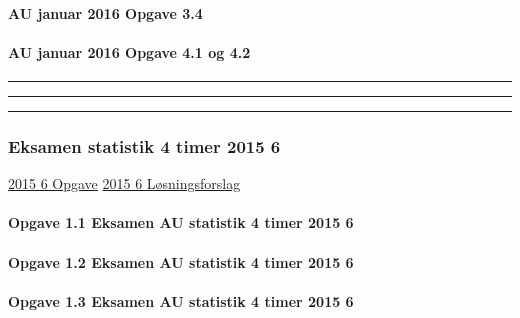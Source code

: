 \documentclass[]{book}
\let\oldparagraph\paragraph
\renewcommand{\paragraph}[1]{\oldparagraph{#1}\mbox{}}
\begin{document}
\hypertarget{au-januar-2016-opgave-3.4}{%
\paragraph{AU januar 2016 Opgave 3.4}\label{au-januar-2016-opgave-3.4}}

\hypertarget{au-januar-2016-opgave-4.1-og-4.2}{%
\paragraph{AU januar 2016 Opgave 4.1 og 4.2}\label{au-januar-2016-opgave-4.1-og-4.2}}

\begin{center}\rule{0.5\linewidth}{\linethickness}\end{center}

\begin{center}\rule{0.5\linewidth}{\linethickness}\end{center}

\begin{center}\rule{0.5\linewidth}{\linethickness}\end{center}

\hypertarget{eksamen-statistik-4-timer-2015-6}{%
\subsubsection{Eksamen statistik 4 timer 2015 6}\label{eksamen-statistik-4-timer-2015-6}}

\href{https://www.dropbox.com/s/lpyp894as98ho11/Smartlearning\%20AU\%202015\%206.pdf?dl=1}{2015 6 Opgave}
\href{https://www.dropbox.com/s/kf4avnc43qpz20d/2015\%206\%20AU\%20SMART\%20Vejledende.docx?dl=1}{2015 6 Løsningsforslag}

\hypertarget{opgave-1.1-eksamen-au-statistik-4-timer-2015-6}{%
\paragraph{Opgave 1.1 Eksamen AU statistik 4 timer 2015 6}\label{opgave-1.1-eksamen-au-statistik-4-timer-2015-6}}

\hypertarget{opgave-1.2-eksamen-au-statistik-4-timer-2015-6}{%
\paragraph{Opgave 1.2 Eksamen AU statistik 4 timer 2015 6}\label{opgave-1.2-eksamen-au-statistik-4-timer-2015-6}}

\hypertarget{opgave-1.3-eksamen-au-statistik-4-timer-2015-6}{%
\paragraph{Opgave 1.3 Eksamen AU statistik 4 timer 2015 6}\label{opgave-1.3-eksamen-au-statistik-4-timer-2015-6}}
\end{document}
